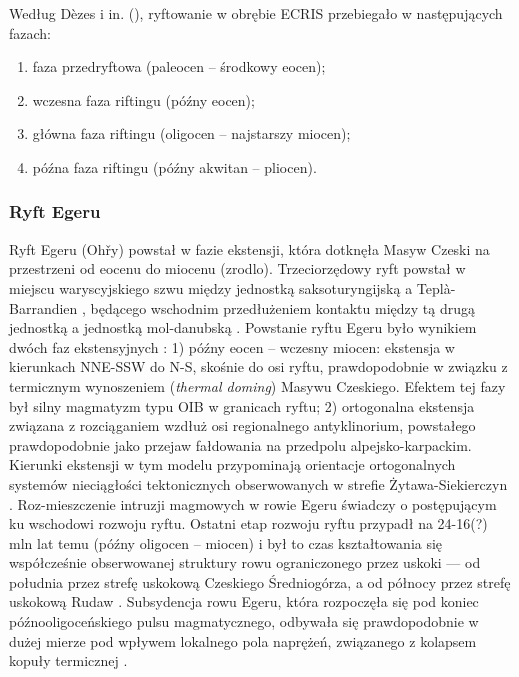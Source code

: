 \documentclass[11.5pt,twoside]{report}
\begin{document}
Według D\`{e}zes i in. (\citeyear{Dezes.2004}), ryftowanie w obrębie ECRIS przebiegało w następujących fazach: 
\begin{enumerate}[nolistsep]
	\item faza przedryftowa (paleocen -- środkowy eocen);
	\item wczesna faza riftingu (pó\'{z}ny eocen);
	\item główna faza riftingu (oligocen -- najstarszy miocen);
	\item pó\'{z}na faza riftingu (pó\'{z}ny akwitan -- pliocen).
\end{enumerate}


\subsubsection{Ryft Egeru}

Ryft Egeru (Oh\v{r}y) powstał w fazie ekstensji, która dotknęła Masyw Czeski na przestrzeni od eocenu do miocenu (zrodlo). Trzeciorzędowy ryft powstał w miejscu waryscyjskiego szwu między jednostką saksoturyngijską a Tepl\`{a}-Barrandien \parencite{Mlcoch.2012}, będącego wschodnim przedłużeniem kontaktu między tą drugą jednostką a jednostką mol-danubską \parencite{Plomerova.2007}. Powstanie ryftu Egeru było wynikiem dwóch faz ekstensyjnych \parencite{Haloda.2012}: 1) pó\'{z}ny eocen -- wczesny miocen: ekstensja w kierunkach NNE-SSW do N-S, skośnie do osi ryftu, prawdopodobnie w związku z termicznym wynoszeniem (\textit{thermal doming}) Masywu Czeskiego. Efektem tej fazy był silny magmatyzm typu OIB w granicach ryftu; 2) ortogonalna ekstensja związana z rozciąganiem wzdłuż osi regionalnego antyklinorium, powstałego prawdopodobnie jako przejaw fałdowania na przedpolu alpejsko-karpackim. Kierunki ekstensji w tym modelu przypominają orientacje ortogonalnych systemów nieciągłości tektonicznych obserwowanych w strefie Żytawa-Siekierczyn \parencite{Piatkowska.2000}. Roz-mieszczenie intruzji magmowych w rowie Egeru świadczy o postępującym ku wschodowi rozwoju ryftu. Ostatni etap rozwoju ryftu przypadł na 24-16(?) mln lat temu (pó\'{z}ny oligocen -- miocen) i był to czas kształtowania się współcześnie obserwowanej struktury rowu ograniczonego przez uskoki \parencite{Adamovic.1999} --- od południa przez strefę uskokową Czeskiego Średniogórza, a od północy przez strefę uskokową Rudaw \parencite{Cajz.2012}. Subsydencja rowu Egeru, która rozpoczęła się pod koniec pó\'{z}nooligoceńskiego pulsu magmatycznego, odbywała się prawdopodobnie w dużej mierze pod wpływem lokalnego pola naprężeń, związanego z kolapsem kopuły termicznej \parencite{Dezes.2004}.
\end{document}

